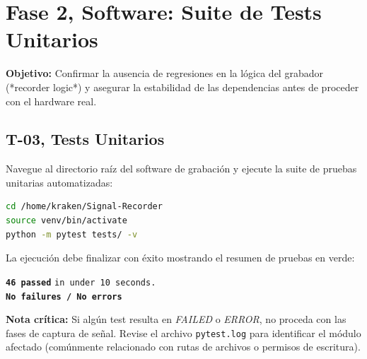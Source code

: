 \section{Fase 2, Software: Suite de Tests Unitarios}

\textbf{Objetivo:} Confirmar la ausencia de regresiones en la lógica del grabador (*recorder logic*) y asegurar la estabilidad de las dependencias antes de proceder con el hardware real.

\subsection{T-03, Tests Unitarios}

Navegue al directorio raíz del software de grabación y ejecute la suite de pruebas unitarias automatizadas:

\begin{lstlisting}[language=bash]
cd /home/kraken/Signal-Recorder
source venv/bin/activate
python -m pytest tests/ -v
\end{lstlisting}

\begin{tcolorbox}[
    colback=blue!5, 
    colframe=deyposcolor, 
    title=Resultado esperado (T-03)
]
La ejecución debe finalizar con éxito mostrando el resumen de pruebas en verde:
\vspace{0.2cm}
\begin{center}
    \texttt{\textbf{\textcolor{green!60!black}{46 passed}}} \texttt{in under 10 seconds.} \\
    \texttt{\textbf{\textcolor{red!80!black}{No failures / No errors}}}
\end{center}
\end{tcolorbox}

\begin{important}
    \textbf{Nota crítica:} Si algún test resulta en \textit{FAILED} o \textit{ERROR}, no proceda con las fases de captura de señal. Revise el archivo \texttt{pytest.log} para identificar el módulo afectado (comúnmente relacionado con rutas de archivos o permisos de escritura).
\end{important}